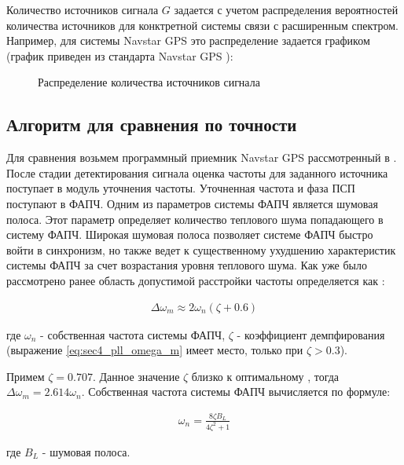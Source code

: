 Количество источников сигнала ${G}$ задается с учетом распределения вероятностей количества источников для конктретной системы
связи с расширенным спектром. Например, для системы Navstar GPS это распределение задается графиком (график приведен из стандарта
Navstar GPS \cite{gpsuserequipment}):
\begin{figure}[ht]
	\center{}
	\caption{Распределение количества источников сигнала}
	\label{pic:sec4_gps_num_of_sats}
\end{figure}

\subsection{Алгоритм для сравнения по точности}

Для сравнения возьмем программный приемник Navstar GPS рассмотренный в \cite{tsui, akos-book}. 
После стадии детектирования сигнала оценка частоты для заданного источника поступает в модуль уточнения частоты. Уточненная частота и фаза ПСП
поступают в ФАПЧ.  Одним из параметров системы ФАПЧ является шумовая полоса. Этот параметр определяет количество теплового шума попадающего в систему ФАПЧ.
Широкая шумовая полоса позволяет системе ФАПЧ быстро войти в синхронизм, но также ведет к существенному ухудшению характеристик системы ФАПЧ за счет
возрастания уровня теплового шума.  Как уже было рассмотрено ранее область допустимой расстройки частоты определяется как \cite{spilker-book}:
\begin{center}
\begin{eqnarray}
	\label{eq:sec4_pll_omega_m}
	\Delta \omega_m \approx 2 \omega_n (\zeta + 0.6)
\end{eqnarray}
\end{center}
где ${\omega_n}$ - собственная частота системы ФАПЧ, ${\zeta}$ - коэффициент демпфирования (выражение \ref{eq:sec4_pll_omega_m} имеет место,
только при ${\zeta > 0.3}$).

Примем ${\zeta=0.707}$. Данное значение ${\zeta}$ близко к оптимальному \cite{tsui, spilker-book},
тогда ${\Delta \omega_m = 2.614 \omega_n}$. Собственная частота системы ФАПЧ вычисляется по формуле:
\begin{center}
\begin{eqnarray}
	\label{eq:sec4_pll_omega_n}
	\omega_n = \frac{8 \zeta B_L}{4 \zeta^2 + 1}
\end{eqnarray}
\end{center}
где ${B_L}$ - шумовая полоса.

